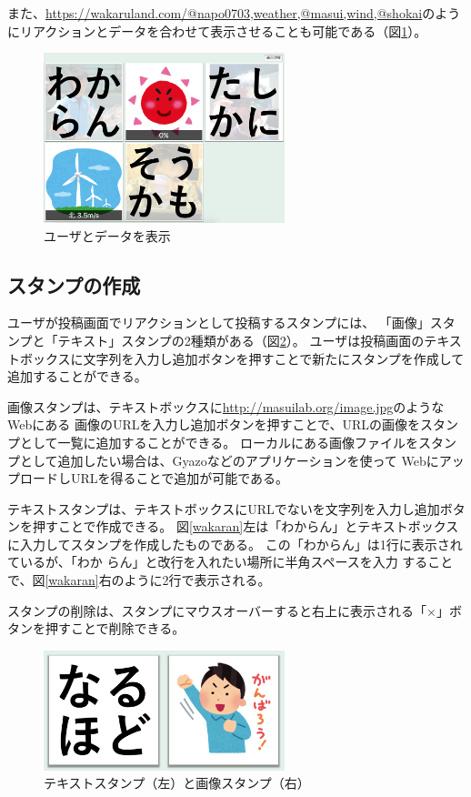 また、\url{https://wakaruland.com/@napo0703,weather,@masui,wind,@shokai}のようにリアクションとデータを合わせて表示させることも可能である（図\ref{n_w_m_w_s}）。

\begin{figure}[h]
\centering
\includegraphics[width=7cm]{images/n_w_m_w_s.png}
\caption{ユーザとデータを表示}
\label{n_w_m_w_s}
\end{figure}

\subsection{スタンプの作成}
ユーザが投稿画面でリアクションとして投稿するスタンプには、
「画像」スタンプと「テキスト」スタンプの2種類がある（図\ref{stamp}）。
ユーザは投稿画面のテキストボックスに文字列を入力し追加ボタンを押すことで新たにスタンプを作成して追加することができる。

画像スタンプは、テキストボックスに\url{http://masuilab.org/image.jpg}のようなWebにある
画像のURLを入力し追加ボタンを押すことで、URLの画像をスタンプとして一覧に追加することができる。
ローカルにある画像ファイルをスタンプとして追加したい場合は、Gyazoなどのアプリケーションを使って
WebにアップロードしURLを得ることで追加が可能である。

テキストスタンプは、テキストボックスにURLでないを文字列を入力し追加ボタンを押すことで作成できる。
図\ref{wakaran}左は「わからん」とテキストボックスに入力してスタンプを作成したものである。
この「わからん」は1行に表示されているが、「わか らん」と改行を入れたい場所に半角スペースを入力
することで、図\ref{wakaran}右のように2行で表示される。

スタンプの削除は、スタンプにマウスオーバーすると右上に表示される「×」ボタンを押すことで削除できる。

\begin{figure}[h]
\centering
\includegraphics[width=7cm]{images/stamp.png}
\caption{テキストスタンプ（左）と画像スタンプ（右）}
\label{stamp}
\end{figure}


